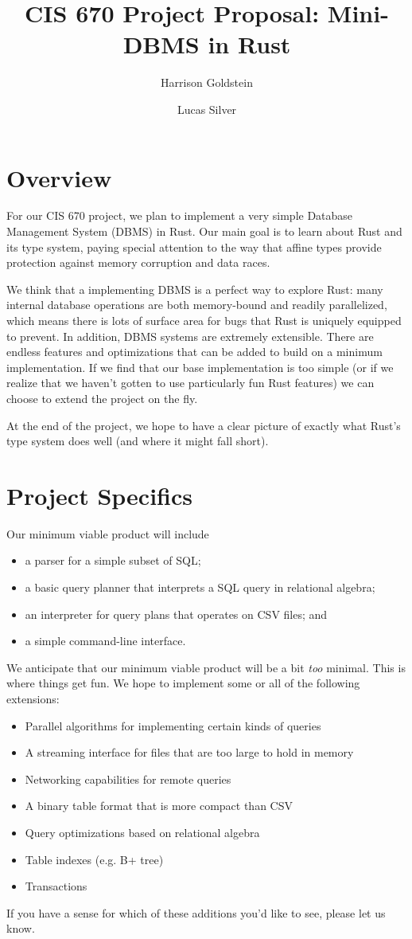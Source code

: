 \documentclass[acmsmall, nonacm, screen]{acmart}
\title{CIS 670 Project Proposal: Mini-DBMS in Rust}
\author{Harrison Goldstein}
\author{Lucas Silver}
\begin{document}
\maketitle

\section{Overview}

For our CIS 670 project, we plan to implement a very simple Database Management System (DBMS) in
Rust. Our main goal is to learn about Rust and its type system, paying special
attention to the way that affine types provide protection against memory corruption and data
races.

We think that a implementing DBMS is a perfect way to explore Rust: many internal database
operations are both memory-bound and readily parallelized, which means there is lots of surface
area for bugs that Rust is uniquely equipped to prevent. In addition, DBMS systems are extremely
extensible. There are endless features and optimizations that can be added to build on a minimum
implementation. If we find that our base implementation is too simple (or if we realize that we
haven't gotten to use particularly fun Rust features) we can choose to extend the project on the
fly.

At the end of the project, we hope to have a clear picture of exactly what Rust's type system does
well (and where it might fall short).

\section{Project Specifics}

Our minimum viable product will include
\begin{itemize}
  \item a parser for a simple subset of SQL;
  \item a basic query planner that interprets a SQL query in relational algebra;
  \item an interpreter for query plans that operates on CSV files; and
  \item a simple command-line interface.
\end{itemize}

We anticipate that our minimum viable product will be a bit {\em too} minimal. This is where
things get fun. We hope to implement some or all of the following extensions:
\begin{itemize}
  \item Parallel algorithms for implementing certain kinds of queries
  \item A streaming interface for files that are too large to hold in memory
  \item Networking capabilities for remote queries
  \item A binary table format that is more compact than CSV
  \item Query optimizations based on relational algebra
  \item Table indexes (e.g. B+ tree)
  \item Transactions
\end{itemize}
If you have a sense for which of these additions you'd like to see, please let us know.
\end{document}

